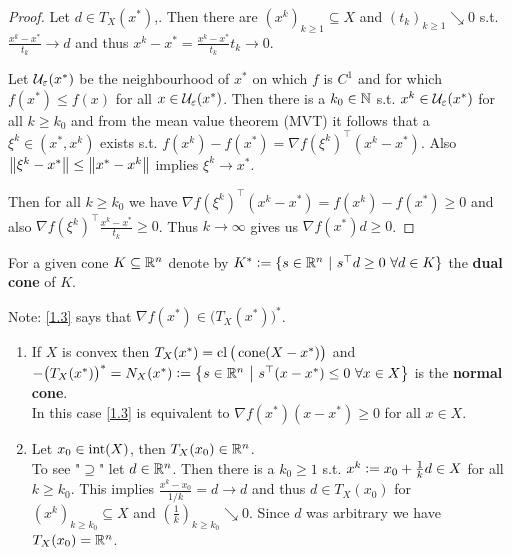\begin{proof}
    Let \(d \in T_X(x^*)\),. Then there are \((x^k)_{k \ge 1} \subseteq X\) and \((t_k)_{k \ge 1} \searrow 0\) s.t. \(\frac{x^k - x^*}{t_k} \to d\) and thus \(x^k - x^* = \frac{x^k - x^*}{t_k} t_k \to 0\).

    Let \(\mathcal{U}_\varepsilon(x^*)\) be the neighbourhood of \(x^*\) on which \(f\) is \(C^1\) and for which \(f(x^*) \le f(x)\) for all \(x \in \mathcal{U}_\varepsilon(x^*)\). Then there is a \( k_0 \in \mathbb{N}\) s.t. \(x^k \in \mathcal{U}_\varepsilon(x^*)\) for all \(k \ge k_0\) and from the mean value theorem (MVT) it follows that a \(\xi^k \in (x^*, x^k)\) exists s.t. \(f(x^k) - f(x^*) = \nabla f(\xi^k)^\top (x^k - x^*)\). Also \(\left\| \xi^k - x^* \right\| \le \left\| x^* - x^k \right\|\) implies \(\xi^k \to x^*\).

    Then for all \(k \ge k_0\) we have \(\nabla f(\xi^k)^\top (x^k - x^*) = f(x^k) - f(x^*) \ge 0\) and also \(\nabla f(\xi^k)^\top \frac{x^k - x^*}{t_k} \ge 0\). Thus \(k \to \infty\) gives us \(\nabla f(x^*) d \ge 0\).
\end{proof}

\begin{definition}\label{def1.2}
    For a given cone \(K \subseteq \mathbb{R}^n\) denote by \(K^* \defeq \{s \in \R^n \ | \ s^\top d \ge 0 \ \forall d \in K\}\) the \textbf{dual cone} of \(K\).

    Note: \eqref{1.3} says that \(\nabla f(x^*) \in \big(T_X(x^*)\big)^*\).
\end{definition}

\begin{remark}\label{rem1.3}
    \begin{enumerate}
        \item If \(X\) is convex then \(T_X(x^*) = \operatorname{cl}\big(\operatorname{cone}(X - x^*)\big)\) and \(-\big(T_X(x^*)\big)^* = N_X(x^*) \mathrel{\mathop:}= \left\{ s \in \mathbb{R}^n \ \middle| \ s^\top (x - x^*) \le 0 \ \forall x \in X \right\}\) is the \textbf{normal cone}. \\
        In this case \eqref{1.3} is equivalent to \(\nabla f(x^*) (x - x^*) \ge 0\) for all \(x \in X\).
        \item Let \(x_0 \in \operatorname{int}(X)\), then \(T_X(x_0) \in \mathbb{R}^n\). \\
        To see "\(\supseteq\)" let \(d \in \mathbb{R}^n\). Then there is a \(k_0 \ge 1\) s.t. \(x^k \mathrel{\mathop:}= x_0 + \frac{1}{k}d \in X\) for all \(k \ge k_0\). This implies \(\frac{x^k - x_0}{1/k} = d \to d\) and thus \(d \in T_X(x_0)\) for \((x^k)_{k \ge k_0} \subseteq X\) and \((\frac{1}{k})_{k \ge k_0} \searrow 0\). Since \(d\) was arbitrary we have \(T_X(x_0) = \mathbb{R}^n\).
    \end{enumerate}
\end{remark}


